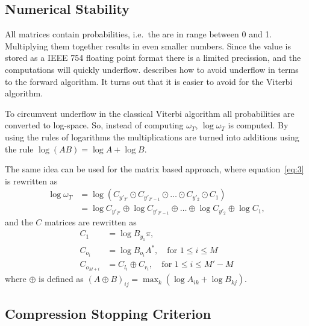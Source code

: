 \subsection{Numerical Stability}
\label{sec:numerical-stability}

All matrices contain probabilities, i.e.\ the are in range between 0 and
1. Multiplying them together results in even smaller numbers. Since the value
is stored as a IEEE 754 floating point format there is a limited precission,
and the computations will quickly underflow. \citet{sand2013ziphmmlib}
describes how to avoid underflow in terms to the forward algorithm. It turns
out that it is easier to avoid for the Viterbi algorithm.

To circumvent underflow in the classical Viterbi algorithm all probabilities
are converted to log-space. So, instead of computing $\omega_T$,
$\log \omega_T$ is computed. By using the rules of logarithms the
multiplications are turned into additions using the rule
$\log(AB) = \log A + \log B$. 

The same idea can be used for the matrix based approach, where
equation~\eqref{eq:3} is rewritten as
\begin{align*}
  \log \omega_T &= \log \left(C_{y'_{T'}} \odot C_{y'_{T'-1}} \odot \dots \odot
                  C_{y'_2} \odot C_1 \right) \\
                &= \log C_{y'_{T'}} \oplus \log C_{y'_{T'-1}} \oplus \dots \oplus
                  \log C_{y'_2} \oplus \log C_1,
\end{align*}
and the $C$ matrices are rewritten as
\begin{align*}
  C_1 &= \log B_{y_1} \pi, \\
  C_{o_i} &= \log B_{o_i} A^*, \quad \text{for }1 \le i \le M\\
  C_{o_{M + i}} &= C_{l_i} \oplus C_{r_i} , \quad \text{for }1 \le i \le M' - M
\end{align*}
where $\oplus$ is defined as
${ \left( A \oplus B \right)}_{ij} = \max_k \left( \log A_{ik} + \log B_{kj}
\right)$.


\subsection{Compression Stopping Criterion}
\label{sec:compr-stopp-crit}


